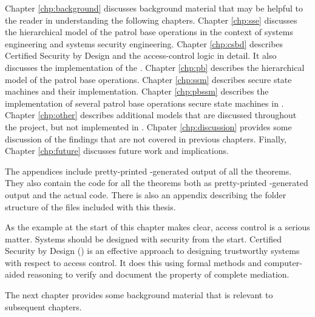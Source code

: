 \documentclass[../../main/main.tex]{subfiles}
\begin{document}
Chapter \ref{chp:background} discusses background material that may be helpful to the reader in understanding the following chapters.  Chapter \ref{chp:sse} discusses the hierarchical model of the patrol base operations in the context of systems engineering and systems security engineering.  Chapter \ref{chp:csbd} describes Certified Security by Design and the access-control logic in detail.  It also discusses the  implementation of the .  Chapter \ref{chp:pb} describes the hierarchical model of the patrol base operations. Chapter \ref{chp:ssm} describes secure state machines and their  implementation.  Chapter \ref{chp:pbssm} describes the implementation of several patrol base operations secure state machines in .  Chapter \ref{chp:other} describes additional models that are discussed throughout the project, but not implemented in .  Chpater \ref{chp:discussion} provides some discussion of the findings that are not covered in previous chapters.  Finally, Chapter \ref{chp:future} discusses future work and implications. 

The appendices include pretty-printed -generated output of all the  theorems.  They also contain the code for all the  theorems both as pretty-printed -generated output and the actual code.  There is also an appendix describing the folder structure of the files included with this thesis.


As the example at the start of this chapter makes clear, access control is a serious matter.  Systems should be designed with security from the start.   Certified Security by Design ()  is an effective approach to designing trustworthy systems with respect to access control.  It does this using formal methods and computer-aided reasoning to verify and document the property of complete mediation.

The next chapter provides some background material that is relevant to subsequent chapters.
\end{document}
